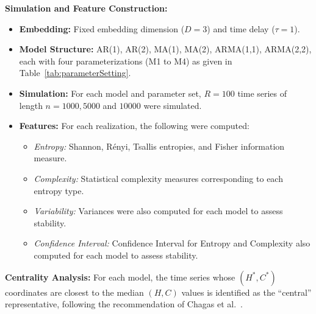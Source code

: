 \documentclass[12pt,a4paper]{article}
\begin{document}
	\textbf{Simulation and Feature Construction:}
	\begin{itemize}
		\item \textbf{Embedding:} Fixed embedding dimension ($D=3$) and time delay ($\tau=1$).
		\item \textbf{Model Structure:} AR(1), AR(2), MA(1), MA(2), ARMA(1,1), ARMA(2,2), each with four parameterizations (M1 to M4) as given in Table~\ref{tab:parameterSetting}.
		\item \textbf{Simulation:} For each model and parameter set, $R=100$ time series of length $n=1000, 5000$ and $10000$ were simulated.
		\item \textbf{Features:} For each realization, the following were computed:
		\begin{itemize}
			\item \emph{Entropy:} Shannon, Rényi, Tsallis entropies, and Fisher information measure.
			\item \emph{Complexity:} Statistical complexity measures corresponding to each entropy type.
			\item \emph{Variability:} Variances were also computed for each model to assess stability.
			\item \emph{Confidence Interval:} Confidence Interval for Entropy and Complexity also computed for each model to assess stability.
		\end{itemize}
	\end{itemize}
	
	\noindent
	\textbf{Centrality Analysis:} For each model, the time series whose $(H^*, C^*)$ coordinates are closest to the median $(H, C)$ values is identified as the “central” representative, following the recommendation of Chagas et al.~\cite{Chagas2022a}.
	
\end{document}
